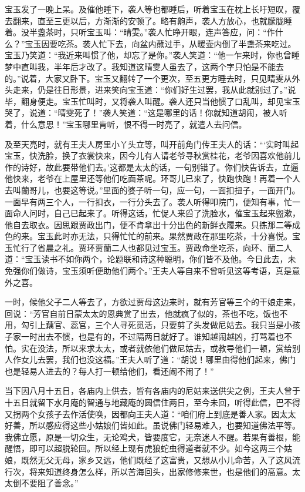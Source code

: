 \documentclass[12pt,oneside]{book}
\begin{document}
宝玉发了一晚上呆。及催他睡下，袭人等也都睡后，听着宝玉在枕上长吁短叹，覆去翻来，直至三更以后，方渐渐的安顿了。略有齁声，袭人方放心，也就朦胧睡着。没半盏茶时，只听宝玉叫：“晴雯。”袭人忙睁开眼，连声答应，问：“作什么？”宝玉因要吃茶。袭人忙下去，向盆内蘸过手，从暖壶内倒了半盏茶来吃过。宝玉乃笑道：“我近来叫惯了他，却忘了是你。”袭人笑道：“他一乍来时，你也曾睡梦中直叫我，半年后才改了。我知道这晴雯人虽去了，这两个字只怕是不能去的。”说着，大家又卧下。宝玉又翻转了一个更次，至五更方睡去时，只见晴雯从外头走来，仍是往日形景，进来笑向宝玉道：“你们好生过罢，我从此就别过了。”说毕，翻身便走。宝玉忙叫时，又将袭人叫醒。袭人还只当他惯了口乱叫，却见宝玉哭了，说道：“晴雯死了！”袭人笑道：“这是哪里的话！你就知道胡闹，被人听着，什么意思！”宝玉哪里肯听，恨不得一时亮了，就遣人去问信。

及至天亮时，就有王夫人房里小丫头立等，叫开前角门传王夫人的话：“‘实时叫起宝玉，快洗脸，换了衣裳快来，因今儿有人请老爷寻秋赏桂花，老爷因喜欢他前儿作的诗好，故此要带他们去。’这都是太太的话，一句别错了。你们快告诉去，立逼他快来，老爷在上屋里还等他们吃面茶呢。环哥儿已来了，快跑快跑！再着一个人去叫蘭哥儿，也要这等说。”里面的婆子听一句，应一句，一面扣扭子，一面开门。一面早有两三个人，一行扣衣，一行分头去了。袭人听得叩院门，便知有事，忙一面命人问时，自己已起来了。听得这话，忙促人来舀了洗脸水，催宝玉起来盥漱，他自去取衣。因思跟贾政出门，便不肯拿出十分出色的新鲜衣履来。只拣那二等成色的来。宝玉此时亦无法，只得忙忙的前来。果然贾政在那里吃茶，十分喜悦。宝玉忙行了省晨之礼。贾环贾蘭二人也都见过宝玉。贾政命坐吃茶，向环、蘭二人道：“宝玉读书不如你两个，论题联和诗这种聪明，你们皆不及他。今日此去，未免强你们做诗，宝玉须听便助他们两个。”王夫人等自来不曾听见这等考语，真是意外之喜。

一时，候他父子二人等去了，方欲过贾母这边来时，就有芳官等三个的干娘走来，回说：“芳官自前日蒙太太的恩典赏了出去，他就疯了似的，茶也不吃，饭也不用，勾引上藕官、蕊官，三个人寻死觅活，只要剪了头发做尼姑去。我只当是小孩子家一时出去不惯，也是有的，不过隔两日就好了。谁知越闹越凶，打骂着也不怕。实在没法，所以来求太太，或者就依他们做尼姑去，或教导他们一顿，赏给别人作女儿去罢，我们也没这福。”王夫人听了道：“胡说！哪里由得他们起来，佛门也是轻易人进去的？每人打一顿给他们，看还闹不闹了！”

当下因八月十五日，各庙内上供去，皆有各庙内的尼姑来送供尖之例，王夫人曾于十五日就留下水月庵的智通与地藏庵的圆信住两日，至今未回，听得此信，巴不得又拐两个女孩子去作活使唤，因都向王夫人道：“咱们府上到底是善人家。因太太好善，所以感应得这些小姑娘们皆如此。虽说佛门轻易难入，也要知道佛法平等。我佛立愿，原是一切众生，无论鸡犬，皆要度它，无奈迷人不醒。若果有善根，能醒悟，即可以超脱轮回。所以经上现有虎狼蛇虫得道者就不少。如今这两三个姑娘，既然无父无母，家乡又远，他们既经了这富贵，又想从小儿命苦，入了这风流行次，将来知道终身怎么样，所以苦海回头，出家修修来世，也是他们的高意。太太倒不要阻了善念。”
\end{document}
